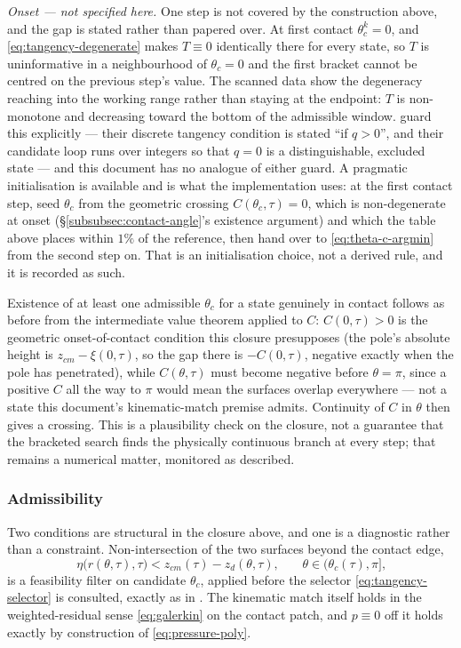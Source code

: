 \emph{Onset --- not specified here.} One step is not covered by the construction above, and the gap is stated rather than papered over. At first contact $\theta_c^k=0$, and \eqref{eq:tangency-degenerate} makes $T\equiv0$ identically there for every state, so $T$ is uninformative in a neighbourhood of $\theta_c=0$ and the first bracket cannot be centred on the previous step's value. The scanned data show the degeneracy reaching into the working range rather than staying at the endpoint: $T$ is non-monotone and decreasing toward the bottom of the admissible window. \cite{AgueroEtAl2026} guard this explicitly --- their discrete tangency condition is stated ``if $q>0$'', and their candidate loop runs over integers so that $q=0$ is a distinguishable, excluded state --- and this document has no analogue of either guard. A pragmatic initialisation is available and is what the implementation uses: at the first contact step, seed $\theta_c$ from the geometric crossing $C(\theta_c,\tau)=0$, which is non-degenerate at onset (\S\ref{subsubsec:contact-angle}'s existence argument) and which the table above places within $1\%$ of the reference, then hand over to \eqref{eq:theta-c-argmin} from the second step on. That is an initialisation choice, not a derived rule, and it is recorded as such.

Existence of at least one admissible $\theta_c$ for a state genuinely in contact follows as before from the intermediate value theorem applied to $C$: $C(0,\tau)>0$ is the geometric onset-of-contact condition this closure presupposes (the pole's absolute height is $z_{cm}-\xi(0,\tau)$, so the gap there is $-C(0,\tau)$, negative exactly when the pole has penetrated), while $C(\theta,\tau)$ must become negative before $\theta=\pi$, since a positive $C$ all the way to $\pi$ would mean the surfaces overlap everywhere --- not a state this document's kinematic-match premise admits. Continuity of $C$ in $\theta$ then gives a crossing. This is a plausibility check on the closure, not a guarantee that the bracketed search finds the physically continuous branch at every step; that remains a numerical matter, monitored as described.

\subsubsection{Admissibility}
\label{subsubsec:admissibility}
Two conditions are structural in the closure above, and one is a diagnostic rather than a constraint. Non-intersection of the two surfaces beyond the contact edge,
\begin{equation}
    \eta\big(r(\theta,\tau),\tau\big) < z_{cm}(\tau)-z_d(\theta,\tau)\text{,}\qquad \theta\in(\theta_c(\tau),\pi]\text{,}
    \label{eq:check-nonintersect}
\end{equation}
is a feasibility filter on candidate $\theta_c$, applied before the selector \eqref{eq:tangency-selector} is consulted, exactly as in \cite{AgueroEtAl2026}. The kinematic match itself holds in the weighted-residual sense \eqref{eq:galerkin} on the contact patch, and $p\equiv0$ off it holds exactly by construction of \eqref{eq:pressure-poly}.

